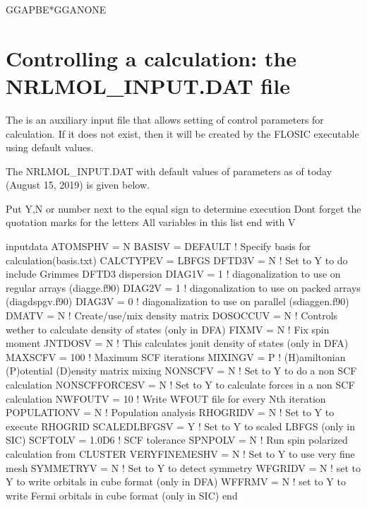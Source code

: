 \documentclass[letterpaper,10pt,english,openany,oneside]{sphinxmanual}
\begin{document}
\sphinxAtStartPar
GGA\sphinxhyphen{}PBE*GGA\sphinxhyphen{}NONE


\chapter{Controlling a calculation: the NRLMOL\_INPUT.DAT file}
\label{\detokenize{docs/nrlmolinputdat:controlling-a-calculation-the-nrlmol-input-dat-file}}\label{\detokenize{docs/nrlmolinputdat:nrlmolinput}}\label{\detokenize{docs/nrlmolinputdat::doc}}
\sphinxAtStartPar
The  is an auxiliary input file that allows setting of control parameters for calculation.  If it does not exist, then it will be
created by the FLOSIC executable using default values.

\sphinxAtStartPar
The NRLMOL\_INPUT.DAT with default values of parameters as of today (August 15, 2019) is given below.

\begin{sphinxVerbatim}[commandchars=\\\{\}]
\PYGZsh{} Put Y,N or number next to the equal sign to determine execution
\PYGZsh{} Don\PYGZsq{}t forget the quotation marks for the letters
\PYGZsh{} All variables in this list end with V

\PYGZam{}input\PYGZus{}data
ATOMSPHV      = \PYGZsq{}N\PYGZsq{}
BASISV        = \PYGZsq{}DEFAULT\PYGZsq{} ! Specify basis for calculation(basis.txt)
CALCTYPEV     = \PYGZsq{}LBFGS\PYGZsq{}
DFTD3V        = \PYGZsq{}N\PYGZsq{} ! Set to Y to do include Grimmes DFT\PYGZhy{}D3 dispersion
DIAG1V        =  1  ! diagonalization to use on regular arrays (diagge.f90)
DIAG2V        =  1  ! diagonalization to use on packed arrays (diag\PYGZus{}dspgv.f90)
DIAG3V        =  0  ! diagonalization to use on parallel (sdiagge\PYGZus{}n.f90)
DMATV         = \PYGZsq{}N\PYGZsq{} ! Create/use/mix density matrix
DOSOCCUV      = \PYGZsq{}N\PYGZsq{} ! Controls wether to calculate density of states (only in DFA)
FIXMV         = \PYGZsq{}N\PYGZsq{} ! Fix spin moment
JNTDOSV       = \PYGZsq{}N\PYGZsq{} ! This calculates jonit density of states (only in DFA)
MAXSCFV       = 100 ! Maximum SCF iterations
MIXINGV       = \PYGZsq{}P\PYGZsq{} ! (H)amiltonian (P)otential (D)ensity matrix mixing
NONSCFV       = \PYGZsq{}N\PYGZsq{} ! Set to Y to do a non SCF calculation
NONSCFFORCESV = \PYGZsq{}N\PYGZsq{} ! Set to Y to calculate forces in a non SCF calculation
NWFOUTV       = 10  ! Write WFOUT file for every N\PYGZhy{}th iteration
POPULATIONV   = \PYGZsq{}N\PYGZsq{} ! Population analysis
RHOGRIDV      = \PYGZsq{}N\PYGZsq{} ! Set to Y to execute RHOGRID
SCALEDLBFGSV  = \PYGZsq{}Y\PYGZsq{} ! Set to Y to scaled LBFGS (only in SIC)
SCFTOLV       = 1.0D\PYGZhy{}6 ! SCF tolerance
SPNPOLV       = \PYGZsq{}N\PYGZsq{} ! Run spin polarized calculation from CLUSTER
VERYFINEMESHV = \PYGZsq{}N\PYGZsq{} ! Set to Y to use very fine mesh
SYMMETRYV     = \PYGZsq{}N\PYGZsq{} ! Set to Y to detect symmetry
WFGRIDV       = \PYGZsq{}N\PYGZsq{} ! set to Y to write orbitals in cube format (only in DFA)
WFFRMV        = \PYGZsq{}N\PYGZsq{} ! set to Y to write Fermi orbitals in cube format (only in SIC)
\PYGZam{}end

\end{sphinxVerbatim}
\end{document}
